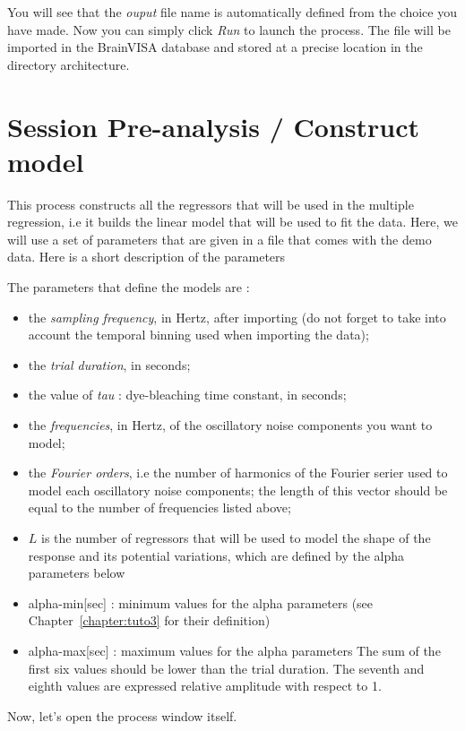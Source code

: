 You will see that the \textit{ouput} file name is automatically defined from the choice you have made. Now you can simply click \textit{Run} to launch the process. The file will be imported in the BrainVISA database and stored at a precise location in the directory architecture.


\section{Session Pre-analysis / Construct model}

This process constructs all the regressors that will be used in the multiple regression, i.e it builds the linear model that will be used to fit the data. Here, we will use a set of parameters that are given in a file that comes with the demo data. Here is a short description of the parameters

The parameters that define the models are :
\begin{itemize}
   \item the \textit{sampling frequency}, in Hertz, after importing (do not forget to take into account the temporal binning used when importing the data);
   \item the \textit{trial duration}, in seconds;
   \item the value of \textit{tau} : dye-bleaching time constant, in seconds;
   \item the \textit{frequencies}, in Hertz, of the oscillatory noise components you want to model;
   \item the \textit{Fourier orders}, i.e the number of harmonics of the Fourier serier used to model each oscillatory noise components; the length of this vector should be equal to the number of {frequencies} listed above;
   \item $L$ is the number of regressors that will be used to model the shape of the response and its potential variations, which are defined by the alpha parameters below
   \item alpha-min[sec] : minimum values for the alpha parameters (see Chapter~\ref{chapter:tuto3} for their definition)
   \item alpha-max[sec] : maximum values for the alpha parameters
       The sum of the first six values should be lower than the trial duration.
       The seventh and eighth values are expressed relative amplitude with respect to 1.
\end{itemize}

Now, let's open the process window itself.


